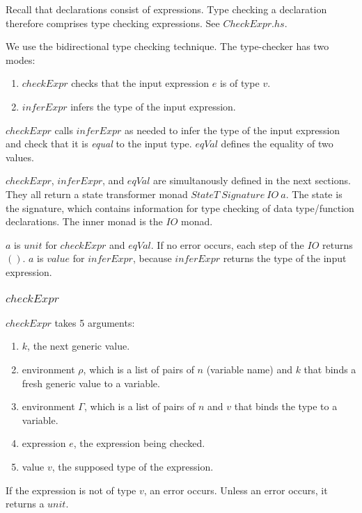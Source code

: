 \documentclass[acmsmall]{acmart}
\begin{document}
Recall that declarations consist of expressions. Type checking a declaration therefore comprises type checking expressions. See $CheckExpr.hs$. 

We use the bidirectional type checking technique. The type-checker has two modes:

\begin{enumerate}
  \item $checkExpr$ checks that the input expression $e$ is of type $v$.
  \item $inferExpr$ infers the type of the input expression.
\end{enumerate}

$checkExpr$ calls $inferExpr$ as needed to infer the type of the input expression and check that it is \emph{equal} to the input type. $eqVal$ defines the equality of two values.

$checkExpr$, $inferExpr$, and $eqVal$ are simultanously defined in the next sections. They all return a state transformer monad $StateT \: Signature \: IO \: a$. The state is the signature, which contains information for type checking of data type/function declarations. The inner monad is the $IO$ monad. 

$a$ is $unit$ for $checkExpr$ and $eqVal$. If no error occurs, each step of the $IO$ returns $\boldsymbol{()}$. $a$ is $value$ for $inferExpr$, because $inferExpr$ returns the type of the input expression.

\subsubsection{$checkExpr$}
\label{sec:checkExpr}

$checkExpr$ takes 5 arguments:

\begin{enumerate}
  \item $k$, the next generic value.
  \item environment $\rho$, which is a list of pairs of $n$ (variable name) and $k$ that binds a fresh generic value to a variable.
  \item environment $\Gamma$, which is a list of pairs of $n$ and $v$ that binds the type to a variable.
  \item expression $e$, the expression being checked.
  \item value $v$, the supposed type of the expression.
\end{enumerate}

If the expression is not of type $v$, an error occurs. Unless an error occurs, it returns a $unit$.
\end{document}
